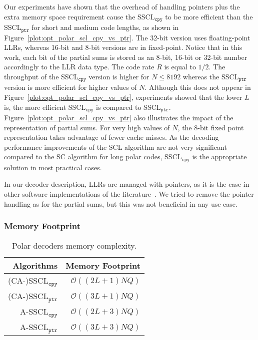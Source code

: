 Our experiments have shown that the overhead of handling pointers plus the
extra memory space requirement cause the SSCL$_{\texttt{cpy}}$ to be more
efficient than the SSCL$_{\texttt{ptr}}$ for short and medium code lengths, as
shown in Figure~\ref{plot:opt_polar_scl_cpy_vs_ptr}. The 32-bit version uses
floating-point LLRs, whereas 16-bit and 8-bit versions are in fixed-point.
Notice that in this work, each bit of the partial sums is stored as an 8-bit,
16-bit or 32-bit number accordingly to the LLR data type. The code rate $R$ is
equal to $1/2$. The throughput of the SSCL$_{\texttt{cpy}}$ version is higher
for $N \leq 8192$ whereas the SSCL$_{\texttt{ptr}}$ version is more efficient
for higher values of $N$. Although this does not appear in
Figure~\ref{plot:opt_polar_scl_cpy_vs_ptr}, experiments showed that the lower
$L$ is, the more efficient SSCL$_{\texttt{cpy}}$ is compared to
SSCL$_{\texttt{ptr}}$. Figure~\ref{plot:opt_polar_scl_cpy_vs_ptr} also
illustrates the impact of the representation of partial sums. For very high
values of $N$, the 8-bit fixed point representation takes advantage of fewer
cache misses. As the decoding performance improvements of the SCL algorithm are
not very significant compared to the SC algorithm for long polar codes,
SSCL$_{\texttt{cpy}}$ is the appropriate solution in most practical cases.

In our decoder description, LLRs are managed with pointers, as it is the case in
other software implementations of the literature~\cite{Sarkis2014b,Sarkis2016,
Shen2016}. We tried to remove the pointer handling as for the partial sums, but
this was not beneficial in any use case.

\subsubsection{Memory Footprint}

\begin{table}[htp]
  \centering
  \caption{Polar decoders memory complexity.}
  \label{tab:opt_polar_scl_memory_footprint}
   \begin{tabular}{r r}
    \textbf{Algorithms}        & \textbf{Memory Footprint} \\
    \hline
    \hline
    (CA-)SSCL$_{\texttt{cpy}}$ & $\mathcal{O}((2L + 1)NQ)$ \\
    (CA-)SSCL$_{\texttt{ptr}}$ & $\mathcal{O}((3L + 1)NQ)$ \\
    A-SSCL$_{\texttt{cpy}}$    & $\mathcal{O}((2L + 3)NQ)$ \\
    A-SSCL$_{\texttt{ptr}}$    & $\mathcal{O}((3L + 3)NQ)$ \\
  \end{tabular}
\end{table}

